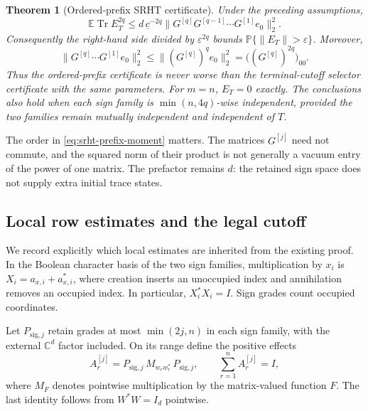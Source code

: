 \documentclass[11pt,a4paper]{article}
\newtheorem{theorem}{Theorem}[section]
\theoremstyle{definition}\newtheorem{definition}[theorem]{Definition}
\theoremstyle{remark}\newtheorem{remark}[theorem]{Remark}
\newcommand{\E}{\mathbb E}\newcommand{\Prob}{\mathbb P}
\newcommand{\Tr}{\operatorname{Tr}}\newcommand{\tr}{\operatorname{Tr}}
\newcommand{\norm}[1]{\lVert#1\rVert}\newcommand{\ip}[2]{\langle#1,#2\rangle}
\numberwithin{equation}{section}
\begin{document}
\begin{theorem}[Ordered-prefix SRHT certificate]
\label{thm:srht-prefix}
Under the preceding assumptions,
\begin{equation}
 \boxed{\displaystyle
 \E\Tr E_T^{2q}
 \le d\,\underline c^{-2q}
       \bigl\|G^{[q]}G^{[q-1]}\cdots G^{[1]}e_0\bigr\|_2^2.}
 \label{eq:srht-prefix-moment}
\end{equation}
Consequently the right-hand side divided by $\varepsilon^{2q}$ bounds
$\mathbb P\{\norm{E_T}>\varepsilon\}$. Moreover,
\begin{equation}
 \bigl\|G^{[q]}\cdots G^{[1]}e_0\bigr\|_2^2
 \le\bigl\|(G^{[q]})^qe_0\bigr\|_2^2
 =\bigl((G^{[q]})^{2q}\bigr)_{00}.
 \label{eq:srht-terminal-comparison}
\end{equation}
Thus the ordered-prefix certificate is never worse than the terminal-cutoff
selector certificate with the same parameters. For $m=n$, $E_T=0$ exactly.
The conclusions also hold when each sign family is
$\min(n,4q)$-wise independent, provided the two families remain mutually
independent and independent of $T$.
\end{theorem}

The order in \eqref{eq:srht-prefix-moment} matters. The matrices
$G^{[j]}$ need not commute, and the squared norm of their product is not
generally a vacuum entry of the power of one matrix. The prefactor remains
$d$: the retained sign space does not supply extra initial trace states.

\subsection{Local row estimates and the legal cutoff}

We record explicitly which local estimates are inherited from the existing
proof. In the Boolean character basis of the two sign families, multiplication
by $x_i$ is $X_i=a_{x,i}+a_{x,i}^*$, where creation inserts an unoccupied
index and annihilation removes an occupied index. In particular,
$X_i^*X_i=I$. Sign grades count occupied coordinates.

Let $P_{\mathrm{sig},j}$ retain grades at most $\min(2j,n)$ in each sign
family, with the external $\mathbb C^d$ factor included. On its range define
the positive effects
\begin{equation}
 A_r^{[j]}=P_{\mathrm{sig},j}\,M_{w_rw_r^*}\,P_{\mathrm{sig},j},
 \qquad \sum_{r=1}^n A_r^{[j]}=I,
 \label{eq:srht-effects}
\end{equation}
where $M_F$ denotes pointwise multiplication by the matrix-valued function
$F$. The last identity follows from $W^*W=I_d$ pointwise.
\end{document}
